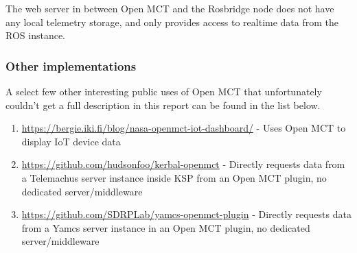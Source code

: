 The web server in between Open MCT and the Rosbridge node does not have any local telemetry storage, and only provides access to realtime data from the ROS instance. \cite{rosmct}

\subsubsection{Other implementations}
A select few other interesting public uses of Open MCT that unfortunately couldn't get a full description in this report can be found in the list below.

\begin{enumerate}
  \item \url{https://bergie.iki.fi/blog/nasa-openmct-iot-dashboard/} - Uses Open MCT to display IoT device data
  \item \url{https://github.com/hudsonfoo/kerbal-openmct} - Directly requests data from a Telemachus server instance inside KSP from an Open MCT plugin, no dedicated server/middleware
  \item \url{https://github.com/SDRPLab/yamcs-openmct-plugin} - Directly requests data from a Yamcs server instance in an Open MCT plugin, no dedicated server/middleware
\end{enumerate}